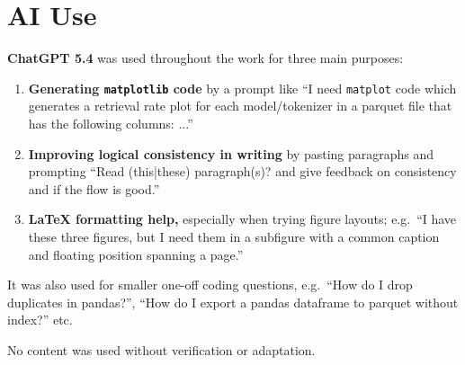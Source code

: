 \chapter{AI Use}

\textbf{ChatGPT 5.4} was used throughout the work for three main purposes:

\begin{enumerate}

\item \textbf{Generating \texttt{matplotlib} code} by a prompt like ``I need \texttt{matplot} code which generates a retrieval rate plot for each model/tokenizer in a parquet file that has the following columns: ...''

\item \textbf{Improving logical consistency in writing} by pasting paragraphs and prompting ``Read (this|these) paragraph(s)? and give feedback on consistency and if the flow is good.''

\item \textbf{\LaTeX{} formatting help,} especially when trying figure layouts; e.g.\ ``I have these three figures, but I need them in a subfigure with a common caption and floating position spanning a page.''

\end{enumerate}

\noindent
It was also used for smaller one-off coding questions, e.g.\ ``How do I drop duplicates in pandas?'', ``How do I export a pandas dataframe to parquet without index?'' etc.

No content was used without verification or adaptation.
